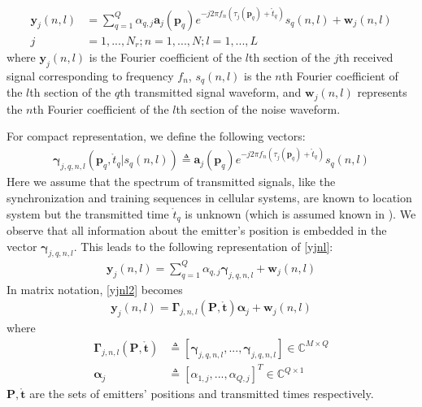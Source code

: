 \documentclass[review]{elsarticle}
\begin{document}
\begin{align}\label{yjnl}
    \boldsymbol{y}_j(n,l)&=\sum_{q=1}^Q\alpha_{q,j}\boldsymbol{a}_j(\boldsymbol{p}_q)e^{-j2\pi f_n(\tau_j(\boldsymbol{p}_q)+\mathring{t}_q)}s_q(n,l)+\boldsymbol{w}_j(n,l)\\ \nonumber
    j&=1,...,N_r;n=1,...,N;l=1,...,L
\end{align}
where $\boldsymbol{y}_j(n,l)$ is the Fourier coefficient of the $l$th section of the $j$th received signal corresponding to frequency $f_n$, $s_q(n,l)$ is the $n$th Fourier coefficient of the $l$th section of the $q$th transmitted signal waveform, and $\boldsymbol{w}_j(n,l)$ represents the $n$th Fourier coefficient of the $l$th section of the noise waveform.

For compact representation, we define the following vectors:
\begin{align}\label{gamma}
    \boldsymbol{\gamma}_{j,q,n,l}(\boldsymbol{p}_q,\mathring{t}_q\vert s_q(n,l))\triangleq\boldsymbol{a}_j(\boldsymbol{p}_q)e^{-j2\pi f_n(\tau_j(\boldsymbol{p}_q)+\mathring{t}_q)}s_q(n,l)
\end{align}
Here we assume that the spectrum of transmitted signals, like the synchronization and training sequences in cellular systems, are known to location system but the transmitted time $\mathring{t}_q$ is unknown (which is assumed known in \cite{DPD2005}). We observe that all information about the emitter’s position is embedded in the vector $\boldsymbol{\gamma}_{j,q,n,l}$. This leads to the following representation of \eqref{yjnl}:
\begin{align}\label{yjnl2}
    \boldsymbol{y}_j(n,l)=\sum_{q=1}^Q\alpha_{q,j}\boldsymbol{\gamma}_{j,q,n,l}+\boldsymbol{w}_j(n,l)
\end{align}
In matrix notation, \eqref{yjnl2} becomes
\begin{align}
    \boldsymbol{y}_j(n,l)=\boldsymbol{\Gamma}_{j,n,l}(\boldsymbol{P},\mathring{\boldsymbol{t}})\boldsymbol{\alpha}_j+\boldsymbol{w}_j(n,l)
\end{align}
where  
\begin{align}\label{Gammajnl}
    \boldsymbol{\Gamma}_{j,n,l}(\boldsymbol{P},\mathring{\boldsymbol{t}})&\triangleq[\boldsymbol{\gamma}_{j,q,n,l},...,\boldsymbol{\gamma}_{j,q,n,l}]\in \mathbb{C}^{M\times Q}\\ \nonumber
    \boldsymbol{\alpha}_j&\triangleq[\alpha_{1,j},...,\alpha_{Q,j}]^T\in \mathbb{C}^{Q\times 1} 
\end{align}
$\boldsymbol{P},\mathring{\boldsymbol{t}}$ are the sets of emitters' positions and transmitted times respectively.
\end{document}
